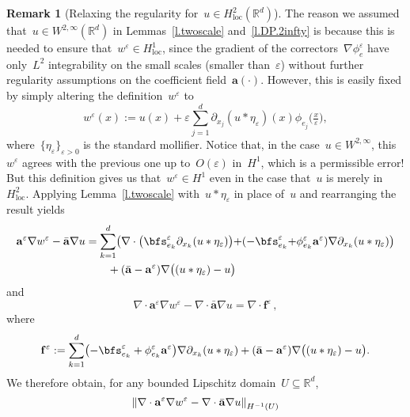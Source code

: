 \documentclass[11pt,twoside]{article} %
\numberwithin{equation}{section}
\theoremstyle{definition}
\newtheorem{remark}[theorem]{Remark}
\let\originalleft\left
\let\originalright\right
\renewcommand{\left}{\mathopen{}\mathclose\bgroup\originalleft}
\renewcommand{\right}{\aftergroup\egroup\originalright}
\newcommand*{\Rd}{\ensuremath{\mathbb{R}^d}}
\newcommand{\eps}{\varepsilon}
\newcommand{\f}{\mathbf{f}}
\newcommand{\ep}{\eps}
\renewcommand{\a}{\mathbf{a}}
\newcommand{\ahom}{\bar{\a}}
\begin{document}
\begin{remark}[{Relaxing the regularity for~$u\in H^2_{\mathrm{loc}}(\Rd)$}]
\label{r.twoscale.H2}
The reason we assumed that~$u\in W^{2,\infty}(\Rd)$ in Lemmas~\ref{l.twoscale} and~\ref{l.DP.2infty} is because this is needed to ensure that~$w^\ep \in H^1_{\mathrm{loc}}$, since the gradient of the correctors~$\nabla \phi_e^\ep$ have only~$L^2$ integrability on the small scales (smaller than~$\ep$) without further regularity assumptions on the coefficient field~$\a(\cdot)$. However, this is easily fixed by simply altering the definition~$w^\ep$ to
\begin{equation}
\label{e.twoscale.mollify}
w^\ep (x)
:=
u(x) 
+ 
\ep \sum_{j=1}^d \partial_{x_j}( u \ast \eta_\ep) (x) \phi_{e_j}\bigl( \tfrac x\ep\bigr),
\end{equation}
where~$\{ \eta_\ep \}_{\ep>0}$ is the standard mollifier. Notice that, in the case~$u\in W^{2,\infty}$, this~$w^\ep$ agrees with the previous one up to~$O(\ep)$ in~$H^1$, which is a permissible error! But this definition gives us that~$w^\ep\in H^1$ even in the case that~$u$ is merely in~$H^2_{\mathrm{loc}}$. Applying Lemma~\ref{l.twoscale} with~$u \ast \eta_\ep$ in place of~$u$ and rearranging the result yields
\begin{align}
\label{e.twoscale.flux.H2}
\a^\ep \nabla w^\ep - \ahom\nabla u
&
=
\sum_{k=1}^d \left( 
\nabla \cdot \bigl ( \bfs^\ep_{e_k}  \partial_{x_k} (u\ast\eta_\ep)  \bigr) 
{+}
(- \bfs^\ep_{e_k} {+} \phi_{e_k}^\ep \a^\ep ) \nabla \partial_{x_k} (u\ast\eta_\ep)  
\right)
\notag \\ 
& \qquad  
+ (\ahom-\a^\ep) \nabla \bigl( (u\ast\eta_\ep) -u \bigr)
\end{align}
and
\begin{equation}
\label{e.twoscale.error.H2}
\nabla \cdot \a^\ep \nabla w^\ep 
-
\nabla\cdot \ahom \nabla u
= 
\nabla\cdot \f^\ep
\,,
\end{equation}
where 
\begin{equation}
\label{e.def.fep.H2}
\f^\ep
:=
\sum_{k=1}^d 
\bigl(
- \bfs_{e_k}^\ep 
+
\phi_{e_k}^\ep \a^\ep 
\bigr) 
\nabla \partial_{x_k} (u\ast\eta_\ep)
+
(\ahom-\a^\ep) \nabla \bigl( (u\ast\eta_\ep) -u \bigr).
\end{equation}
We therefore obtain, for any bounded Lipschitz domain~$U\subseteq \Rd$,  
\begin{equation}
\label{e.twoscale.explicit.rem}
\left\|
\nabla \cdot \a^\ep \nabla w^\ep 
-
\nabla\cdot \ahom \nabla u
\right\|_{H^{-1}(U)} 

\end{equation}
\end{remark}
\end{document}
